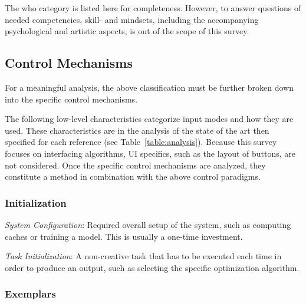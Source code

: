 The who category is listed here for completeness. However, to answer questions of needed competencies, skill- and mindsets, including the accompanying psychological and artistic aspects, is out of the scope of this survey.


\subsection{Control Mechanisms}
\label{subsec:taxo_control_mechanism}

For a meaningful analysis, the above classification must be further broken down into the specific control mechanisms. 

The following low-level characteristics categorize input modes and how they are used. These characteristics are in the analysis of the state of the art then specified for each reference (see Table~\ref{table:analysis}). Because this survey focuses on interfacing algorithms, UI specifics, such as the layout of buttons, are not considered. Once the specific control mechanisms are analyzed, they constitute a method in combination with the above control paradigms.

\subsubsection{Initialization}
\textit{System Configuration}: Required overall setup of the system, such as computing caches or training a model. This is usually a one-time investment.

\textit{Task Initialization}: A non-creative task that has to be executed each time in order to produce an output, such as selecting the specific optimization algorithm.



\subsubsection{Exemplars}


